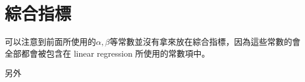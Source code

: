 \section{綜合指標}

可以注意到前面所使用的$\alpha, \beta$等常數並沒有拿來放在綜合指標，因為這些常數的會全部都會被包含在 linear regression 所使用的常數項中。

另外
